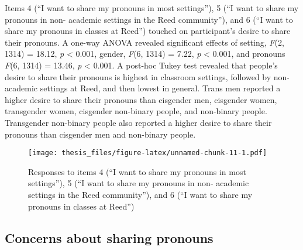 \documentclass[12pt,twoside]{reedthesis}
\begin{document}
Items 4 (``I want to share my pronouns in most settings''), 5 (``I want to share my pronouns in non- academic settings in the Reed community''), and 6 (``I want to share my pronouns in classes at Reed'') touched on participant's desire to share their pronouns. A one-way ANOVA revealed significant effects of setting, \emph{F}(2, 1314) = 18.12, \emph{p} \textless{} 0.001, gender, \emph{F}(6, 1314) = 7.22, \emph{p} \textless{} 0.001, and pronouns \emph{F}(6, 1314) = 13.46, \emph{p} \textless{} 0.001. A post-hoc Tukey test revealed that people's desire to share their pronouns is highest in classroom settings, followed by non-academic settings at Reed, and then lowest in general. Trans men reported a higher desire to share their pronouns than cisgender men, cisgender women, transgender women, cisgender non-binary people, and non-binary people. Transgender non-binary people also reported a higher desire to share their pronouns than cisgender men and non-binary people.
\begin{figure}
\centering
\texttt{[image: thesis\_files/figure-latex/unnamed-chunk-11-1.pdf]}
\caption{\label{fig:unnamed-chunk-11}Responses to items 4 (``I want to share my pronouns in most settings''), 5 (``I want to share my pronouns in non- academic settings in the Reed community''), and 6 (``I want to share my pronouns in classes at Reed'')}
\end{figure}
\hypertarget{concerns-about-sharing-pronouns}{%
\subsection{Concerns about sharing pronouns}\label{concerns-about-sharing-pronouns}}
\end{document}
